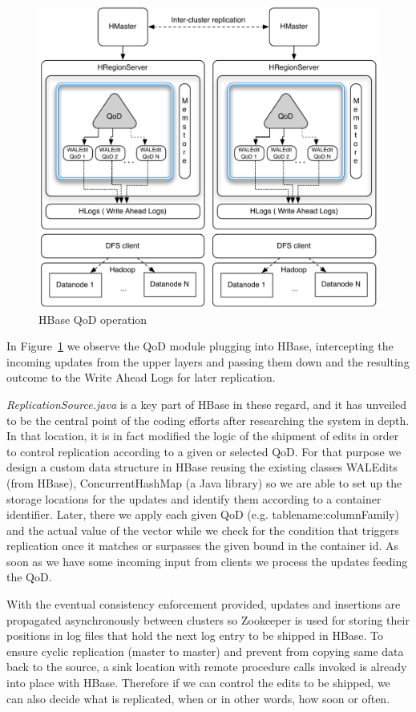 \begin{figure}[t]
\centering
\includegraphics[width=0.8\linewidth]{figs/multi-site.pdf}
\caption{HBase QoD operation}
\label{fig-qod-module}
\end{figure}

In Figure~\ref{fig-qod-module} we observe the QoD module plugging into HBase, intercepting the incoming updates from the upper layers and passing them down and the resulting outcome to the Write Ahead Logs for later replication.

\emph{ReplicationSource.java} is a key part of HBase in these regard, and it has unveiled to be the central point of the coding efforts after researching the system in depth. In that location, it is in fact modified the logic of the shipment of edits in order to control replication according to a given or selected QoD. For that purpose we design a custom data structure in HBase reusing the existing classes WALEdits (from HBase), ConcurrentHashMap (a Java library) so we are able to set up the storage locations for the updates and identify them according to a container identifier. Later, there we apply each given QoD (e.g. tablename:columnFamily) and the actual value of the vector while we check for the condition that triggers replication once it matches or surpasses the given bound in the container id. As soon as we have some incoming input from clients we process the updates feeding the QoD.

With the eventual consistency enforcement provided, updates and insertions are propagated asynchronously between clusters so Zookeeper is used for storing their positions in log files that hold the next log entry to be shipped in HBase. To ensure cyclic replication (master to master) and prevent from copying same data back to the source, a sink location with remote procedure calls invoked is already into place with HBase. Therefore if we can control the edits to be shipped, we can also decide what is replicated, when or in other words, how soon or often.

